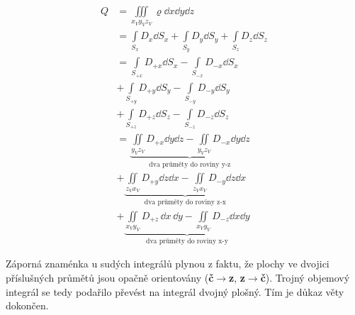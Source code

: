       \begin{align*}
        Q &= \iiint\limits_{x_Vy_Vz_V}\varrho\dd{x}\dd{y}\dd{z}                  \\
          &= \int\limits_{S_x}D_x\dd{S_x} + 
             \int\limits_{S_y}D_y\dd{S_y} + 
             \int\limits_{S_z}D_z\dd{S_z}                                                  \\
          &= \int\limits_{S_{+x}}D_{+x}\dd{S_x} - \int\limits_{S_{-x}}D_{-x}\dd{S_x}       \\
          &+ \int\limits_{S_{+y}}D_{+y}\dd{S_y} - \int\limits_{S_{-y}}D_{-y}\dd{S_y}       \\
          &+ \int\limits_{S_{+z}}D_{+z}\dd{S_z} - \int\limits_{S_{-z}}D_{-z}\dd{S_z}       \\
          &= \underbrace{\iint\limits_{y_Vz_V}D_{+x}\dd{y}\dd{z} 
           - \iint\limits_{y_Vz_V}D_{-x}\dd{y}\dd{z}}_{\text{dva průměty do roviny y-z}}   \\
          &+ \underbrace{\iint\limits_{z_Vx_V}D_{+y}\dd{z}\dd{x} 
           - \iint\limits_{z_Vx_V}D_{-y}\dd{z}\dd{x}}_{\text{dva průměty do roviny z-x}}   \\
          &+ \underbrace{\iint\limits_{x_Vy_V}D_{+z}\,\dd{x}\,\dd{y} 
           - \iint\limits_{x_Vy_V}D_{-z}\dd{x}\dd{y}}_{\text{dva průměty do roviny x-y}}
      \end{align*}

      Záporná znaménka u sudých integrálů plynou z faktu, že plochy ve dvojici příslušných průmětů
      jsou opačně orientovány (\textbf{č}\(\rightarrow\)\textbf{z},
      \textbf{z}\(\rightarrow\)\textbf{č}). Trojný objemový integrál se tedy podařilo převést na
      integrál dvojný plošný. Tím je důkaz věty dokončen.
      
